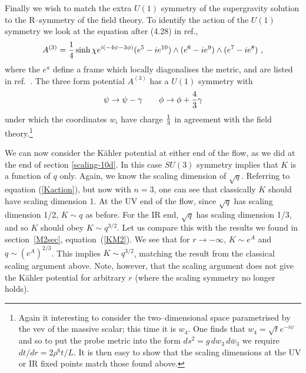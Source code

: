 \documentclass[a4paper,12pt]{article}
\newcommand{\reef}[1]{(\ref{#1})}
\begin{document}
Finally we wish to match the extra $U(1)$ symmetry of the supergravity
solution to the R--symmetry of the field theory. To identify the
action of the $U(1)$ symmetry we look at the equation after (4.28) in
ref.\cite{newwarner},
\begin{equation}
 A^{(3)} = {1 \over 4} \sinh{\chi} 
e^{i(-4 \psi -3 \phi)} 
(e^5 - i e^{10}) \wedge (e^6 - i e^9) \wedge (e^7 - i e^8)\ , 
\end{equation}
where the $e^a$ define a frame which locally diagonalises the metric,
and are listed in ref.~\cite{newwarner}. The three form potential
$A^{(3)}$ has a $U(1)$ symmetry with
\begin{equation}
  \psi \rightarrow \psi - 
\gamma \qquad \phi \rightarrow \phi + {4 \over 3} \gamma
\end{equation} 
under which the coordinates $w_i$ have charge ${1 \over 3}$ in
agreement with the field theory.\footnote{Again it interesting to
  consider the two--dimensional space parametrised by the vev of the
  massive scalar; this time it is $w_4$.  One finds that $w_4 =
  \sqrt{t} e^{-i\psi}$ and so to put the probe metric into the form
  $ds^2 = g \, dw_3 \, d\bar{w}_3$ we require
  ${dt / dr} = {2 \rho^6 t / L}$. 
It is then easy to show that the scaling dimensions at the UV or IR
fixed points match those found above.}

We can now consider the K\"ahler potential at either end of the flow,
as we did at the end of section \ref{scaling-10d}. In this case
$SU(3)$ symmetry implies that $K$ is a function of $q$ only.  Again,
we know the scaling dimension of $\sqrt{q}$.  Referring to equation
\reef{Kaction}, but now with $n=3$, one can see that classically $K$
should have scaling dimension 1.  At the UV end of the flow, since
$\sqrt{q}$ has scaling dimension 1/2, $K \sim q$ as before.  For the
IR end, $\sqrt{q}$ has scaling dimension 1/3, and so $K$ should obey
$K \sim q^{3/2}$.  Let us compare this with the results we found in
section~\ref{M2sec},  equation~\reef{KM2}.  We see that
for $r \to -\infty$, $K \sim e^A$ and $q \sim (e^A)^{2/3}$.  This
implies $K \sim q^{3/2}$, matching the result from the classical
scaling argument above. Note, however, that the scaling argument does
not give the K\"ahler potential for arbitrary $r$ (where the scaling
symmetry no longer holds).
\end{document}
